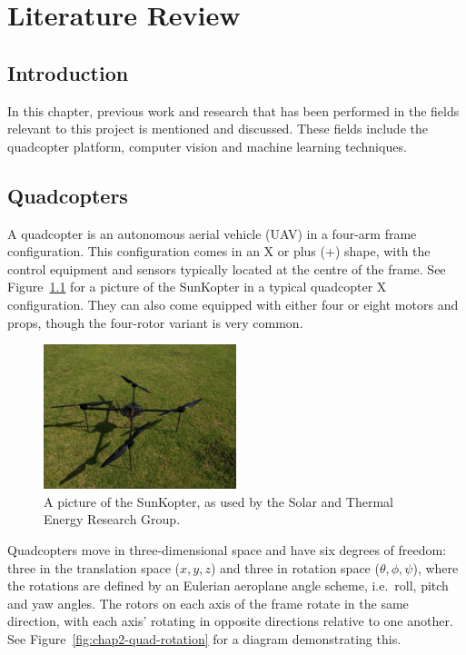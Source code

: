 \chapter{Literature Review}
\label{chap2}

\section{Introduction}

In this chapter, previous work and research that has been performed in the fields relevant to this project is mentioned and discussed. These fields include the quadcopter platform, computer vision and machine learning techniques. 

\section{Quadcopters}

A quadcopter is an autonomous aerial vehicle (UAV) in a four-arm frame configuration. This configuration comes in an X or plus (+) shape, with the control equipment and sensors typically located at the centre of the frame. See Figure~\ref{fig:chap2-quad} for a picture of the SunKopter in a typical quadcopter X configuration. They can also come equipped with either four or eight motors and props, though the four-rotor variant is very common.

\begin{figure}
  \centering
  \includegraphics[clip, trim = 0 0 30 20, width=0.5\textwidth]{figures/chapter2/quadcopter}
  \caption[A picture of the SunKopter, as used by STERG.]{A picture of the SunKopter, as used by the Solar and Thermal Energy Research Group.}
\label{fig:chap2-quad}
\end{figure}

Quadcopters move in three-dimensional space and have six degrees of freedom: three in the translation space ($x, y, z$) and three in rotation space ($\theta, \phi, \psi$), where the rotations are defined by an Eulerian aeroplane angle scheme, i.e.\ roll, pitch and yaw angles. The rotors on each axis of the frame rotate in the same direction, with each axis' rotating in opposite directions relative to one another. See Figure~\ref{fig:chap2-quad-rotation} for a diagram demonstrating this. 

